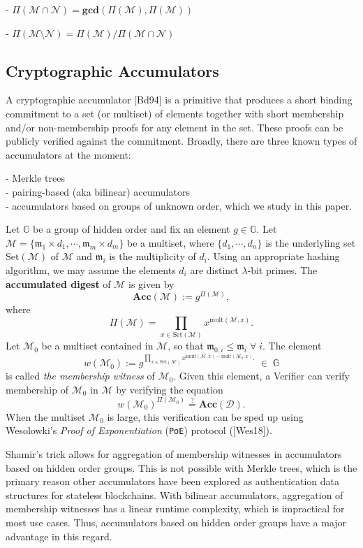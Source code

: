 \documentclass[11pt, lettersize, notitlepage, leqno, footskip=0.6cm]{article}
\newcommand{\pl}{\prod\limits}
\newcommand{\Acc}{\mbf{Acc}}
\newcommand{\sett}{\mr{Set}}
\newcommand{\mult}{\mr{mult}}
\newcommand{\mc}{\mathcal}
\newcommand{\mb}{\mathbb}
\newcommand{\mbf}{\mathbf}
\newcommand{\mr}{\mathrm}
\newcommand{\mfm}{\mathfrak{m}}
\newcommand{\sm}{\setminus}
\newcommand{\lam}{\lambda}
\newcommand{\vs}{\vspace{-0.15cm}}
\newcommand{\noin}{\noindent}
\newcommand{\sta}{\stackrel{?}{=}}
\newcommand{\GCD}{\mbf{gcd}}
\numberwithin{equation}{section}
\begin{document}
\noin - $\Pi(\mc{M}\cap \mc{N}) = \GCD(\Pi(\mc{M}), \Pi(\mc{M}))$

\noin - $\Pi(\mc{M}\sm \mc{N}) = {\Pi(\mc{M})}/{\Pi(\mc{M}\cap \mc{N})}$

\subsection{\fontsize{11}{11}\selectfont Cryptographic Accumulators }

A cryptographic accumulator [Bd94] is a primitive that produces a short binding commitment to a set (or multiset) of elements together with short membership and/or non-membership proofs for any element in the set. These proofs can be publicly verified against the commitment. Broadly, there are three known types of accumulators at the moment: 

\noin - Merkle trees\\
- pairing-based (aka bilinear) accumulators \\  
- accumulators based on groups of unknown order, which we study in this paper. 

Let $\mb{G}$ be a group of hidden order and fix an element $g \in\mb{G}$. Let $\mc{M}= \{\mfm_1\times d_1,\cdots, \mfm_m\times d_m\}$ be a multiset, where $\{d_1,\cdots, d_n \}$ is the underlyling set $\sett(\mc{M})$ of $\mc{M}$ and $\mfm_i$ is the multiplicity of $d_i$. Using an appropriate hashing algorithm, we may assume the elements $d_i$ are distinct $\lam$-bit primes. The \textbf{accumulated digest} of $\mc{M}$ is given by \vs $$\Acc(\mc{M}):= g^{\Pi(\mc{M})} ,$$ where $$\Pi(\mc{M}) = \pl_{x\in \sett(\mc{M})} x^{\mult(\mc{M},x)} .$$ Let $\mc{M}_0$ be a multiset contained in $\mc{M}$, so that  $\mfm_{0,i}\leq \mfm_i\;\forall\;i$. The element \vs $$w(\mc{M}_0):= g^{\pl_{x\in \sett(\mc{M})} x^{\mult(\mc{M},x)-\mult(\mc{M}_0,x)} .}\;\in\;\mb{G} $$ is called \textit{the membership witness} of $\mc{M}_0$. Given this element, a Verifier can verify membership of $\mc{M}_0$ in $\mc{M}$ by verifying the equation \vs $$w(\mc{M}_0)^{\Pi(\mc{M}_0)} \sta \Acc(\mc{D}).$$ When the multiset $\mc{M}_0$ is large, this verification can be sped up using Wesolowki's \textit{Proof of Exponentiation} (\verb|PoE|) protocol ([Wes18]).

Shamir's trick allows for aggregation of membership witnesses in accumulators based on hidden order groups. This is not possible with Merkle trees, which is the primary reason other accumulators have been explored as authentication data structures for stateless blockchains. With bilinear accumulators, aggregation of membership witnesses has a linear runtime complexity, which is impractical for most use cases. Thus, accumulators based on hidden order groups have a major advantage in this regard.
\end{document}
